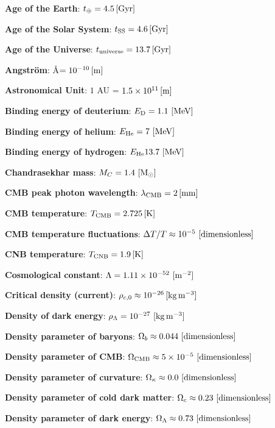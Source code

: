 \documentclass[a4paper,11pt]{article}
\begin{document}
{\noindent}\textbf{Age of the Earth}: $t_\oplus = 4.5\,[{\rm Gyr}]$

{\noindent}\textbf{Age of the Solar System}: $t_\mathrm{SS} = 4.6\,[{\rm Gyr}]$

{\noindent}\textbf{Age of the Universe}: $t_\mathrm{universe} = 13.7\,[{\rm Gyr}]$

{\noindent}\textbf{Angstr\"{o}m}: \AA$ = 10^{-10}\,[{\rm m}]$

{\noindent}\textbf{Astronomical Unit}: $1$ AU = $1.5\times10^{11}\,[{\rm m}]$

{\noindent}\textbf{Binding energy of deuterium}: $E_\mathrm{D} = 1.1 ~ [{\rm MeV}]$

{\noindent}\textbf{Binding energy of helium}: $E_\mathrm{He} = 7 ~ [{\rm MeV}]$

{\noindent}\textbf{Binding energy of hydrogen}: $E_\mathrm{He} 13.7 ~ [{\rm MeV}]$

{\noindent}\textbf{Chandrasekhar mass}: $M_C = 1.4 ~ [{\rm M_\odot}]$

{\noindent}\textbf{CMB peak photon wavelength}: $\lambda_\mathrm{CMB} = 2\,[{\rm mm}]$

{\noindent}\textbf{CMB temperature}: $T_\mathrm{CMB} = 2.725\,[{\rm K}]$

{\noindent}\textbf{CMB temperature fluctuations}: $\Delta T/T\approx10^{-5} ~ [{\rm dimensionless}]$

{\noindent}\textbf{CNB temperature}: $T_\mathrm{CNB} = 1.9\,[{\rm K}]$

{\noindent}\textbf{Cosmological constant}: $\Lambda=1.11\times10^{-52} ~ [{\rm m^{-2}}]$

{\noindent}\textbf{Critical density (current)}: $\rho_{c,0}\approx10^{-26}\,[{\rm kg\,m^{-3}}]$

{\noindent}\textbf{Density of dark energy}: $\rho_\Lambda = 10^{-27} ~ [{\rm kg\,m^{-3}}]$

{\noindent}\textbf{Density parameter of baryons}: $\Omega_b \approx 0.044 ~ [{\rm dimensionless}]$

{\noindent}\textbf{Density parameter of CMB}: $\Omega_\mathrm{CMB} \approx 5\times10^{-5} ~ [{\rm dimensionless}]$

{\noindent}\textbf{Density parameter of curvature}: $\Omega_\kappa \approx 0.0 ~ [{\rm dimensionless}]$

{\noindent}\textbf{Density parameter of cold dark matter}: $\Omega_c \approx 0.23 ~ [{\rm dimensionless}]$

{\noindent}\textbf{Density parameter of dark energy}: $\Omega_\Lambda \approx 0.73 ~ [{\rm dimensionless}]$
\end{document}
